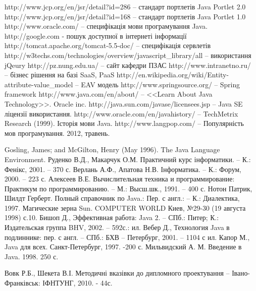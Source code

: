 \renewcommand{\refname}{СПИСОК ПОСИЛАНЬ НА ДЖЕРЕЛА}
\begin{thebibliography}{99}
 http://www.jcp.org/en/jsr/detail?id=286 -- стандарт портлетів Java Portlet 2.0
 http://www.jcp.org/en/jsr/detail?id=168 -- стандарт портлетів Java Portlet 1.0
\bibitem{} http://www.oracle.com/ -- специфікація мови програмування Java.
 http://google.com - пошук доступної в інтернеті інформації
 http://tomcat.apache.org/tomcat-5.5-doc/ -- специфікація сервлетів
 http://w3techs.com/technologies/overview/javascript\_library/all -- використання jQeury
 http://pz.nung.edu.ua/ -- сайт кафедри ПЗАС
 http://www.intranetno.ru/ -- бізнес рішення на базі SaaS, PaaS
 http://en.wikipedia.org/wiki/Entity-attribute-value\_model -- EAV модель
\bibitem{} http://www.springsource.org/ --  Spring framework
\bibitem{} http://www.java.com/en/about/ -- <<Learn About Java Technology>>. Oracle inc.
\bibitem{} http://java.sun.com/javase/licensees.jsp -- Java SE ліцензії використання.
\bibitem{} http://www.oracle.com/en/javahistory/ -- TechMetrix Research (1999). Історія мови Java.
\bibitem{} http://www.langpop.com/ -- Популярність мов програмування. 2012, травень.

\bibitem{} Gosling, James; and McGilton, Henry (May 1996). The Java Language Environment.
\bibitem{} Руденко В.Д., Макарчук О.М. Практичний курс інформатики. -- К.: Фенікс, 2001. -- 370 с.
\bibitem{} Верлань А.Ф., Апатова Н.В. Інформатика. -- К.: Форум, 2000. -- 223 с.
\bibitem{} Алексеев В.Е. Вычислительная техника и программирование: Практикум по программированию. -- М.: Высш.шк., 1991. -- 400 с.
\bibitem{} Нотон Патрик, Шилдт Герберт. Полный справочник по Java.: Пер. с англ.: -- К.: Диалектика, 1997.
\bibitem{} Магические зерна Sun. COMPUTER WORLD Киев, №29-30 (19 августа 1998) с.10.
\bibitem{} Бишоп Д., Эффективная работа: Java 2. -- СПб.: Питер; К.: Издательская группа BHV, 2002. -- 592с.: ил. 
\bibitem{} Вебер Д., Технология Java в подлиннике: пер. с англ. -- СПб.: БХВ – Петербург, 2001. – 1104 с ил.
\bibitem{} Капор М., Java для всех. Санкт-Петербург, 1997. -200 с.
\bibitem{} Мильвидский А. М. Введение в Java. 1998. 250 с.




\bibitem{}  Вовк Р.Б., Шекета В.І. Методичні вказівки до дипломного проектування – Івано-Франківськ: ІФНТУНГ, 2010. - 44с.




\end{thebibliography}
